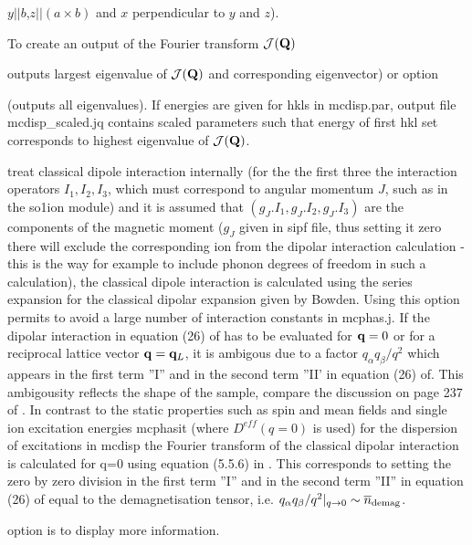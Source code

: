\begin{description}
\begin{description}
$y||b$,$z||(a \times b)$ and $x$ perpendicular to $y$ and $z$).
 \item [{\prg -jqm}]To create an output of the Fourier transform ${\mathcal J}({\mathbf Q})$
				\item [{\prg -jq}] outputs largest eigenvalue of ${\mathcal J}({\mathbf Q})$ and 
corresponding eigenvector) or option
\item [ {\prg -jqe} ](outputs all eigenvalues). 
 If energies are given for hkls in mcdisp.par, output file mcdisp\_scaled.jq contains scaled parameters
 such that energy of first hkl set corresponds to highest eigenvalue of ${\mathcal J}({\mathbf Q})$.
\item[{\prg  -cd}] treat classical dipole interaction internally (for the the first three 
   the interaction operators $I_1,I_2,I_3$, which must correspond to angular momentum $J$, such as in the so1ion module)
             and it
                 is assumed that $(g_J.I_1,g_J.I_2,g_J.I_3)$ are 
the components of the magnetic moment ($g_J$ given in sipf file, thus setting it zero there will exclude the
corresponding ion from the dipolar interaction calculation - this is the way for example to include 
phonon degrees of freedom in such a calculation),
 the classical dipole interaction is calculated using the series expansion for 
the classical dipolar expansion 
   given by Bowden\cite{bowden81-827}. Using this option permits to avoid a 
large number of interaction constants in
{\prg mcphas.j}. If the dipolar interaction in equation (26) of\cite{bowden81-827} 
has to be evaluated for $\mathbf q=0$ or for a reciprocal lattice vector 
$\mathbf q=\mathbf q_L$, it is ambigous due to a factor $q_{\alpha}q_{\beta}/q^2$ which appears
in the first term ''I'' and in the second term ''II' in equation (26) 
of\cite{bowden81-827}. This ambigousity reflects the shape
of the sample, compare the discussion on page 237 of \cite{jensen91-1}.
 In contrast to the static properties
such as spin and mean fields and single ion excitation energies {\prg mcphasit} 
(where $D^{eff}(q=0)$ is used) for the 
dispersion of excitations in {\prg mcdisp} the Fourier transform of the
classical dipolar interaction is calculated for q=0 using equation 
(5.5.6) in  \cite{jensen91-1}. This corresponds to setting the 
zero by zero division in the first term ''I''
and in the second term ''II'' in equation (26) of\cite{bowden81-827} equal to
the demagnetisation tensor, i.e.
$q_{\alpha}q_{\beta}/q^2 |_{q\rightarrow 0} \sim \overline{n}_{\rm demag}$.
				\item [{\prg -v}] option is to display more information.
                                

\end{description}
\end{description}

